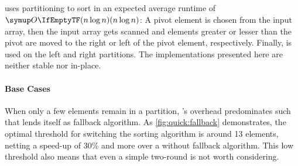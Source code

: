 \subsection{\texorpdfstring{\QS{}}{QuickSort}}
\label{subsec:tasklet:quick}


\QS{} uses partitioning to sort in an expected average runtime of \(\bigoh{n \log n}\):
A pivot element is chosen from the input array, then the input array gets scanned and elements greater or lesser than the pivot are moved to the right or left of the pivot element, respectively.
Finally, \QS{} is used on the left and right partitions.
The \QS*{} implementations presented here are neither stable nor in-place.


\paragraph{Base Cases}
When only a few elements remain in a partition, \QS{}'s overhead predominates such that \IS{} lends itself as fallback algorithm.
As \cref{fig:quick:fallback} demonstrates, the optimal threshold for switching the sorting algorithm is around 13 elements, netting a speed-up of 30\% and more over a \QS{} without fallback algorithm.
This low threshold also means that even a simple two-round \ShS{} is not worth considering.

%

